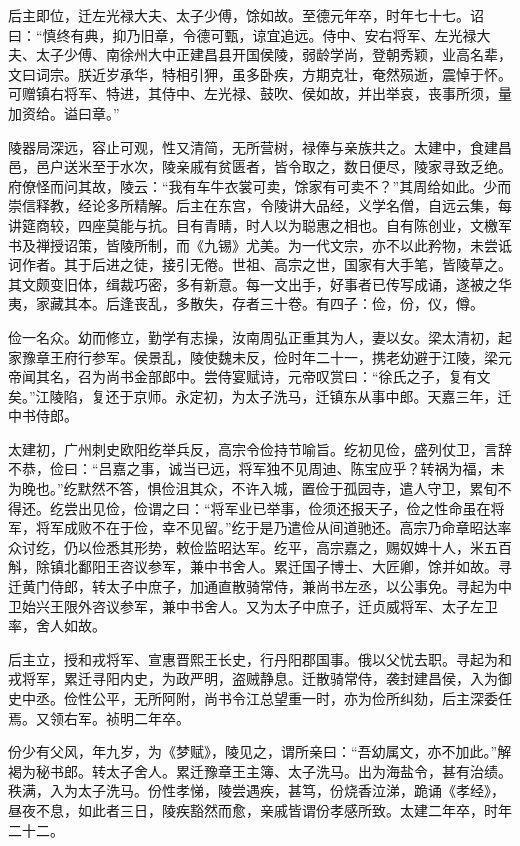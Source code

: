 \documentclass[]{article}
\begin{document}
后主即位，迁左光禄大夫、太子少傅，馀如故。至德元年卒，时年七十七。诏曰：``慎终有典，抑乃旧章，令德可甄，谅宜追远。侍中、安右将军、左光禄大夫、太子少傅、南徐州大中正建昌县开国侯陵，弱龄学尚，登朝秀颖，业高名辈，文曰词宗。朕近岁承华，特相引狎，虽多卧疾，方期克壮，奄然殒逝，震悼于怀。可赠镇右将军、特进，其侍中、左光禄、鼓吹、侯如故，并出举哀，丧事所须，量加资给。谥曰章。''

陵器局深远，容止可观，性又清简，无所营树，禄俸与亲族共之。太建中，食建昌邑，邑户送米至于水次，陵亲戚有贫匮者，皆令取之，数日便尽，陵家寻致乏绝。府僚怪而问其故，陵云：``我有车牛衣裳可卖，馀家有可卖不？''其周给如此。少而崇信释教，经论多所精解。后主在东宫，令陵讲大品经，义学名僧，自远云集，每讲筵商较，四座莫能与抗。目有青睛，时人以为聪惠之相也。自有陈创业，文檄军书及禅授诏策，皆陵所制，而《九锡》尤美。为一代文宗，亦不以此矜物，未尝诋诃作者。其于后进之徒，接引无倦。世祖、高宗之世，国家有大手笔，皆陵草之。其文颇变旧体，缉裁巧密，多有新意。每一文出手，好事者已传写成诵，遂被之华夷，家藏其本。后逢丧乱，多散失，存者三十卷。有四子：俭，份，仪，僔。

俭一名众。幼而修立，勤学有志操，汝南周弘正重其为人，妻以女。梁太清初，起家豫章王府行参军。侯景乱，陵使魏未反，俭时年二十一，携老幼避于江陵，梁元帝闻其名，召为尚书金部郎中。尝侍宴赋诗，元帝叹赏曰：``徐氏之子，复有文矣。''江陵陷，复还于京师。永定初，为太子洗马，迁镇东从事中郎。天嘉三年，迁中书侍郎。

太建初，广州刺史欧阳纥举兵反，高宗令俭持节喻旨。纥初见俭，盛列仗卫，言辞不恭，俭曰：``吕嘉之事，诚当已远，将军独不见周迪、陈宝应乎？转祸为福，未为晚也。''纥默然不答，惧俭沮其众，不许入城，置俭于孤园寺，遣人守卫，累旬不得还。纥尝出见俭，俭谓之曰：``将军业已举事，俭须还报天子，俭之性命虽在将军，将军成败不在于俭，幸不见留。''纥于是乃遣俭从间道驰还。高宗乃命章昭达率众讨纥，仍以俭悉其形势，敕俭监昭达军。纥平，高宗嘉之，赐奴婢十人，米五百斛，除镇北鄱阳王咨议参军，兼中书舍人。累迁国子博士、大匠卿，馀并如故。寻迁黄门侍郎，转太子中庶子，加通直散骑常侍，兼尚书左丞，以公事免。寻起为中卫始兴王限外咨议参军，兼中书舍人。又为太子中庶子，迁贞威将军、太子左卫率，舍人如故。

后主立，授和戎将军、宣惠晋熙王长史，行丹阳郡国事。俄以父忧去职。寻起为和戎将军，累迁寻阳内史，为政严明，盗贼静息。迁散骑常侍，袭封建昌侯，入为御史中丞。俭性公平，无所阿附，尚书令江总望重一时，亦为俭所纠劾，后主深委任焉。又领右军。祯明二年卒。

份少有父风，年九岁，为《梦赋》，陵见之，谓所亲曰：``吾幼属文，亦不加此。''解褐为秘书郎。转太子舍人。累迁豫章王主簿、太子洗马。出为海盐令，甚有治绩。秩满，入为太子洗马。份性孝悌，陵尝遇疾，甚笃，份烧香泣涕，跪诵《孝经》，昼夜不息，如此者三日，陵疾豁然而愈，亲戚皆谓份孝感所致。太建二年卒，时年二十二。
\end{document}
